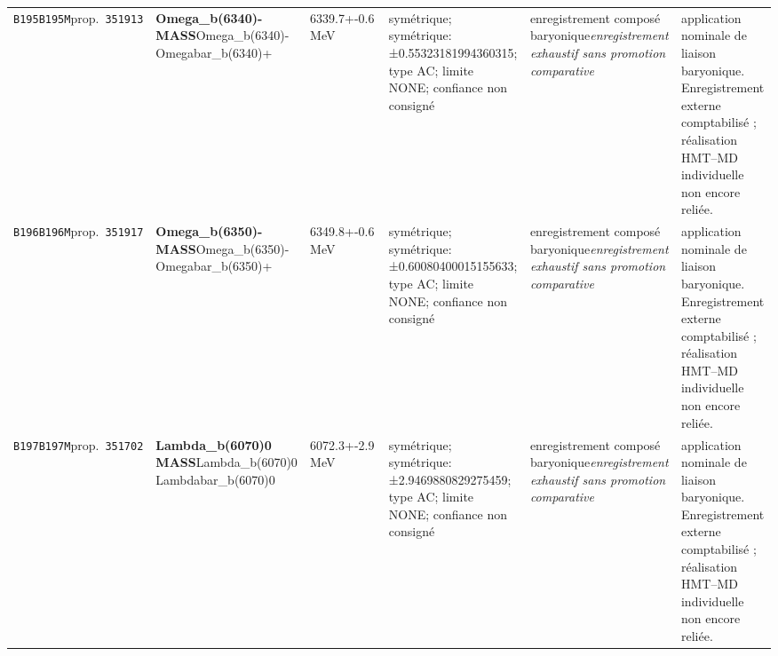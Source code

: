 \begin{landscape}
\begin{longtable}{L{1.85cm}L{4.45cm}L{2.35cm}L{4.05cm}L{3.35cm}L{7.15cm}}
\texttt{B195}\newline \texttt{B195M}\newline prop.\ \texttt{351913} & \textbf{Omega\_\allowbreak{}b(6340)- MASS}\newline Omega\_\allowbreak{}b(6340)- \textbar{}\allowbreak{} Omegabar\_\allowbreak{}b(6340)+ & 6339.7+-0.6\,MeV & symétrique; symétrique: ±0.55323181994360315; type AC; limite NONE; confiance non consigné & enregistrement composé baryonique\newline \emph{enregistrement exhaustif sans promotion comparative} & application nominale de liaison baryonique. Enregistrement externe comptabilisé ; réalisation HMT--MD individuelle non encore reliée. \\
\texttt{B196}\newline \texttt{B196M}\newline prop.\ \texttt{351917} & \textbf{Omega\_\allowbreak{}b(6350)- MASS}\newline Omega\_\allowbreak{}b(6350)- \textbar{}\allowbreak{} Omegabar\_\allowbreak{}b(6350)+ & 6349.8+-0.6\,MeV & symétrique; symétrique: ±0.60080400015155633; type AC; limite NONE; confiance non consigné & enregistrement composé baryonique\newline \emph{enregistrement exhaustif sans promotion comparative} & application nominale de liaison baryonique. Enregistrement externe comptabilisé ; réalisation HMT--MD individuelle non encore reliée. \\
\texttt{B197}\newline \texttt{B197M}\newline prop.\ \texttt{351702} & \textbf{Lambda\_\allowbreak{}b(6070)0 MASS}\newline Lambda\_\allowbreak{}b(6070)0 \textbar{}\allowbreak{} Lambdabar\_\allowbreak{}b(6070)0 & 6072.3+-2.9\,MeV & symétrique; symétrique: ±2.9469880829275459; type AC; limite NONE; confiance non consigné & enregistrement composé baryonique\newline \emph{enregistrement exhaustif sans promotion comparative} & application nominale de liaison baryonique. Enregistrement externe comptabilisé ; réalisation HMT--MD individuelle non encore reliée. \\

\end{longtable}
\end{landscape}
